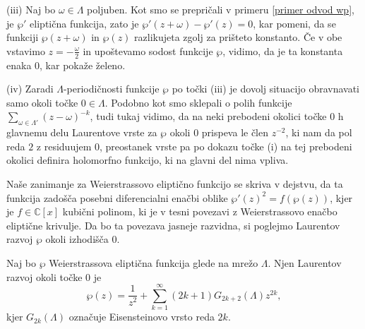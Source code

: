 \documentclass[mat1]{fmfdelo}
\numberwithin{equation}{section}
\newcommand{\C}{\mathbb C}
\newcommand{\om}{\omega}
\theoremstyle{definition}
\begin{document}
\begin{dokaz}
    (iii) Naj bo $\om\in \Lambda$ poljuben. Kot smo se prepričali v primeru \ref{primer odvod wp}, je $\wp'$ eliptična funkcija, zato je $\wp'(z + \om) - \wp'(z) = 0$, kar pomeni, da se funkciji $\wp(z + \om)$ in $\wp(z)$ razlikujeta zgolj za prišteto konstanto. Če v obe vstavimo $z = -\frac{\omega}{2}$ in upoštevamo sodost funkcije $\wp$, vidimo, da je ta konstanta enaka $0$, kar pokaže želeno.

    (iv) Zaradi $\Lambda$-periodičnosti funkcije $\wp$ po točki (iii) je dovolj situacijo obravnavati samo okoli točke $0\in\Lambda$. Podobno kot smo sklepali o polih funkcije $\sum_{\om\in\Lambda'}(z-\om)^{-k}$, tudi tukaj vidimo, da na neki prebodeni okolici točke $0$ h glavnemu delu Laurentove vrste za $\wp$ okoli $0$ prispeva le člen $z^{-2}$, ki nam da pol reda $2$ z residuujem $0$, preostanek vrste pa po dokazu točke (i) na tej prebodeni okolici definira holomorfno funkcijo, ki na glavni del nima vpliva.  
\end{dokaz}

Naše zanimanje za Weierstrassovo eliptično funkcijo se skriva v dejstvu, da ta funkcija zadošča posebni diferencialni enačbi oblike $\wp'(z)^2 = f(\wp(z))$, kjer je $f \in \C[x]$ kubični polinom, ki je v tesni povezavi z Weierstrassovo enačbo eliptične krivulje. Da bo ta povezava jasneje razvidna, si poglejmo Laurentov razvoj $\wp$ okoli izhodišča $0$. 

\begin{lema}
    Naj bo $\wp$ Weierstrassova eliptična funkcija glede na mrežo $\Lambda$. Njen Laurentov razvoj okoli točke $0$ je
    \begin{equation}
        \label{eq: Laurentov razvoj wp}
        \wp(z) = \frac{1}{z^2} + \sum_{k = 1}^\infty(2k + 1)G_{2k + 2}(\Lambda)z^{2k},  
    \end{equation}
    kjer $G_{2k}(\Lambda)$ označuje Eisensteinovo vrsto reda $2k$.
\end{lema}
\end{document}

